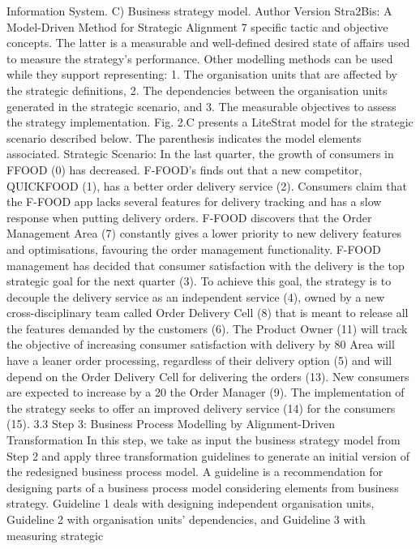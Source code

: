 Information System. C) Business strategy model.
Author Version
Stra2Bis: A Model-Driven Method for Strategic Alignment 7
specific tactic and objective concepts. The latter is a measurable and well-defined
desired state of affairs used to measure the strategy’s performance.
Other modelling methods can be used while they support representing: 1.
The organisation units that are affected by the strategic definitions, 2. The
dependencies between the organisation units generated in the strategic scenario,
and 3. The measurable objectives to assess the strategy implementation. Fig.
2.C presents a LiteStrat model for the strategic scenario described below. The
parenthesis indicates the model elements associated.
Strategic Scenario: In the last quarter, the growth of consumers in FFOOD (0) has decreased. F-FOOD’s finds out that a new competitor, QUICKFOOD (1), has a better order delivery service (2). Consumers claim that the
F-FOOD app lacks several features for delivery tracking and has a slow response
when putting delivery orders. F-FOOD discovers that the Order Management
Area (7) constantly gives a lower priority to new delivery features and optimisations, favouring the order management functionality. F-FOOD management has
decided that consumer satisfaction with the delivery is the top strategic goal for
the next quarter (3). To achieve this goal, the strategy is to decouple the delivery
service as an independent service (4), owned by a new cross-disciplinary team
called Order Delivery Cell (8) that is meant to release all the features demanded
by the customers (6). The Product Owner (11) will track the objective of increasing consumer satisfaction with delivery by 80%
Area will have a leaner order processing, regardless of their delivery option (5)
and will depend on the Order Delivery Cell for delivering the orders (13). New
consumers are expected to increase by a 20%
the Order Manager (9). The implementation of the strategy seeks to offer an
improved delivery service (14) for the consumers (15).
3.3 Step 3: Business Process Modelling by Alignment-Driven
Transformation
In this step, we take as input the business strategy model from Step 2 and
apply three transformation guidelines to generate an initial version of the redesigned business process model. A guideline is a recommendation for designing
parts of a business process model considering elements from business strategy.
Guideline 1 deals with designing independent organisation units, Guideline 2
with organisation units’ dependencies, and Guideline 3 with measuring strategic
